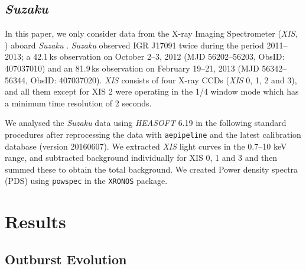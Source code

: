 \subsection{\textit{Suzaku}}

\par In this paper, we only consider data from the X-ray Imaging Spectrometer (\textit{XIS}, \citealp{Koyama_XIS}) aboard \textit{Suzaku} \citep{Mitsuda_Suzaku}.  \textit{Suzaku} observed IGR J17091 twice during the period 2011--2013; a 42.1\,ks observation on October 2--3, 2012 (MJD 56202--56203, ObsID: 407037010) and an 81.9\,ks observation on February 19--21, 2013 (MJD 56342--56344, ObsID: 407037020). \textit{XIS} consists of four X-ray CCDs (\textit{XIS} 0, 1, 2 and 3), and all them except for XIS 2 were operating in the 1/4 window mode which has a minimum time resolution of 2 seconds.
\par We analysed the \textit{Suzaku} data using {\it HEASOFT} 6.19 in the following standard procedures after reprocessing the data with \texttt{aepipeline} and the latest calibration database (version 20160607).  We extracted \textit{XIS} light curves in the 0.7--10 keV range, and subtracted background individually for XIS 0, 1 and 3 and then summed these to obtain the total background.  We created Power density spectra (PDS) using {\tt powspec} in the {\tt XRONOS} package.

\section{Results}
\label{sec:results}

\subsection{Outburst Evolution}

